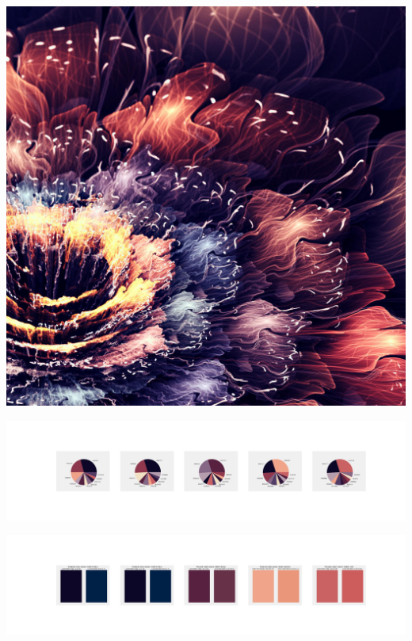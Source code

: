 \documentclass[11pt]{article}
\begin{document}
\begin{landscape}
    \begin{center}
    \includegraphics[width=\textwidth]{./nbimg/file (132).jpg}
    \end{center}

    \begin{center}
    \includegraphics[width=250mm]{./nbimg/pie-37.jpg}
    \end{center}

    \begin{center}
    \includegraphics[width=250mm]{./nbimg/peak-37.jpg}
    \end{center}
    


\end{landscape}
\end{document}

